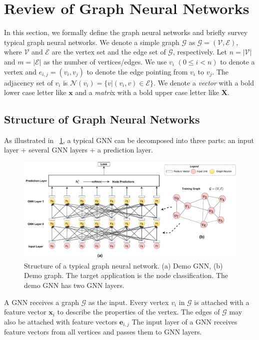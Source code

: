 \section{Review of Graph Neural Networks}
\label{sec:review_of_gnns}

In this section, we formally define the graph neural networks and briefly survey typical graph neural networks.
We denote a simple graph $\mathcal{G}$ as $\mathcal{G}=(\mathcal{V}, \mathcal{E})$, where $\mathcal{V}$ and $\mathcal{E}$ are the vertex set and the edge set of $\mathcal{G}$, respectively.
Let $n=|\mathcal{V}|$ and $m=|\mathcal{E}|$ as the number of vertices/edges.
We use $v_i$ $(0 \leq i < n)$ to denote a vertex and $e_{i,j}=(v_i, v_j)$ to denote the edge pointing from $v_i$ to $v_j$.
The adjacency set of $v_i$ is $\mathcal{N}(v_i)=\{v|(v_i, v) \in \mathcal{E}\}$.
We denote a \emph{vector} with a bold lower case letter like $\boldsymbol{x}$ and a \emph{matri}x with a bold upper case letter like $\boldsymbol{X}$.

\subsection{Structure of Graph Neural Networks}

As illustrated in \figurename~\ref{fig:general_structure_of_gnn}, a typical GNN can be decomposed into three parts: an input layer + several GNN layers + a prediction layer.

\begin{figure}
    \centering
    \includegraphics[width=1\columnwidth]{figs/illustration/GNN_common_architecture.pdf}
    \caption{Structure of a typical graph neural network. (a) Demo GNN, (b) Demo graph. The target application is the node classification. The demo GNN has two GNN layers.}
    \label{fig:general_structure_of_gnn}
\end{figure}

A GNN receives a graph $\mathcal{G}$ as the input.
Every vertex $v_i$ in $\mathcal{G}$ is attached with a feature vector $\boldsymbol{x}_i$ to describe the properties of the vertex.
The edges of $\mathcal{G}$ may also be attached with feature vectors $\boldsymbol{e}_{i,j}$
The input layer of a GNN receives feature vectors from all vertices and passes them to GNN layers.

